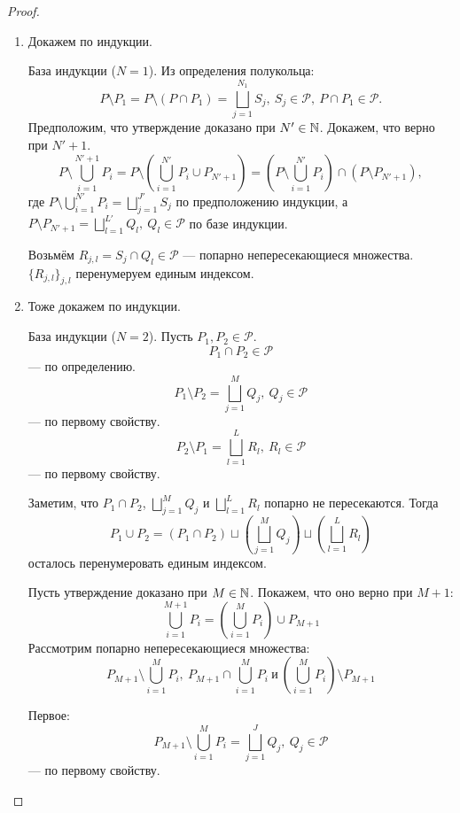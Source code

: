 \begin{proof}\tab
\begin{enumerate}
    \item Докажем по индукции.
    
    База индукции ($N = 1$). Из определения полукольца:
    \[P \setminus P_1 = P \setminus (P \cap P_1) = \bigsqcup\limits_{j = 1}^{N_1} S_j, \ S_j \in \mathcal{P}, \ P \cap P_1 \in \mathcal{P}.\]
    Предположим, что утверждение доказано при $N' \in \mathbb{N}$. Докажем, что верно при $N' + 1$.
    \[P \setminus \bigcup\limits_{i = 1}^{N' + 1} P_i = P \setminus \left(\bigcup\limits_{i = 1}^{N'} P_i \cup P_{N' + 1}\right) = \left( P \setminus \bigcup\limits_{i=1}^{N'} P_i \right) \cap (P \setminus P_{N' + 1}),\]
    где $P \setminus \bigcup\limits_{i=1}^{N'} P_i = \bigsqcup\limits_{j = 1}^{J'} S_j$ по предположению индукции, а 
    $P \setminus P_{N' + 1} = \bigsqcup\limits_{l = 1}^{L'} Q_l, \ Q_l \in \mathcal{P}$ по базе индукции.
    
    Возьмём $R_{j, l} = S_j \cap Q_l \in \mathcal{P}$ — попарно непересекающиеся множества. $\{R_{j,l}\}_{j, l}$ перенумеруем единым индексом.

    \item Тоже докажем по индукции.
    
    База индукции ($N = 2$). Пусть $P_1, P_2 \in \mathcal{P}$.
    $$P_1 \cap P_2 \in \mathcal{P}$$
    — по определению. 
    $$P_1 \setminus P_2 = \bigsqcup_{j=1}^M Q_j, \ Q_j \in \mathcal{P}$$
    — по первому свойству.
    $$P_2 \setminus P_1 = \bigsqcup_{l=1}^L R_l, \ R_l \in \mathcal{P}$$
    — по первому свойству.

    Заметим, что $P_1 \cap P_2$, $\bigsqcup_{j=1}^M Q_j$ и $\bigsqcup_{l=1}^L R_l$ попарно не пересекаются.
    Тогда
    \[P_1 \cup P_2 = (P_1 \cap P_2) \sqcup \left(\bigsqcup_{j=1}^M Q_j\right) \sqcup \left(\bigsqcup_{l=1}^L R_l\right)\]
    осталось перенумеровать единым индексом.

    Пусть утверждение доказано при $M \in \mathbb{N}$. Покажем, что оно верно при $M + 1$:
    \[\bigcup_{i=1}^{M+1} P_i = \left( \bigcup_{i=1}^M P_i \right) \cup P_{M+1}\]
    Рассмотрим попарно непересекающиеся множества:
    \[P_{M+1} \setminus \bigcup_{i=1}^M P_i, \ P_{M+1} \cap \bigcup_{i=1}^M P_i \ \text{и} \ \left( \bigcup_{i=1}^M P_i \right) \setminus P_{M+1}\]

    Первое:
    \begin{equation}
        P_{M+1} \setminus \bigcup_{i=1}^M P_i = \bigsqcup_{j=1}^{J} Q_j, \ Q_j \in \mathcal{P}
    \end{equation}
    — по первому свойству.


\end{enumerate}
\end{proof}
